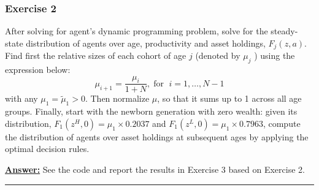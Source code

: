 \documentclass{article} %
\theoremstyle{definition}
\newenvironment{solution}[1][Answer]{\begin{singlespace}\underline{\textbf{#1:}}\quad }{\ \rule{0.3em}{0.3em}\end{singlespace}} %
\begin{document}
\subsubsection*{Exercise 2}
After solving for agent's dynamic programming problem, solve for the steady-state distribution of agents over age, productivity and asset holdings, $ F_j (z, a) $. Find first the relative sizes of each cohort of age $ j $ (denoted by $ \mu_j $ ) using the expression below: \[ \mu_{i+1} = \frac{\mu_i}{1 +N}, \; \text{for } \; i = 1, \hdots, N-1  \]  with any $ \mu_1 = \tilde{\mu}_1 >0 $. Then normalize $ \mu $, so that it sums up to 1 across all age groups. Finally, start with the newborn generation with zero wealth: given its distribution, $ F_1(z^H, 0) = \mu_1 × 0.2037 $ and $ F_1(z^L, 0) = \mu_1×0.7963 $, compute the distribution of agents over asset holdings at subsequent ages by applying the optimal decision rules.
\begin{solution}
  See the code and report the results in Exercise 3 based on Exercise 2.  
\end{solution}
\end{document}
